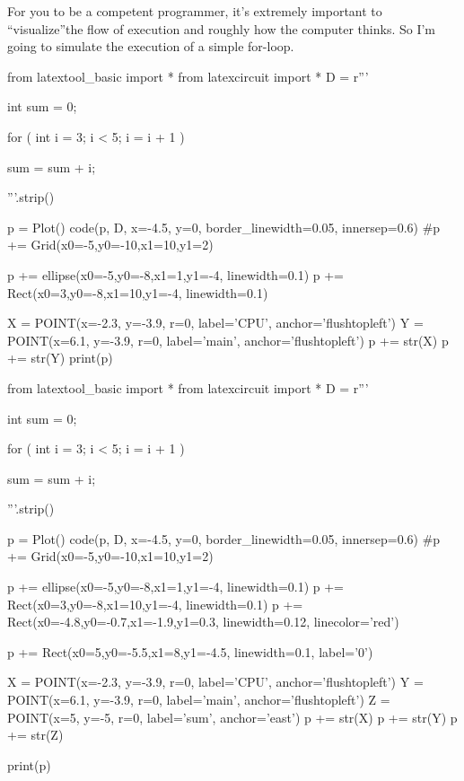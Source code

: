For you to be a competent programmer, it's extremely important to ``visualize''the flow of execution and roughly how the computer thinks. So I'm going to simulate the execution of a simple for-loop.

\begin{python}
from latextool_basic import *
from latexcircuit import *
D = r'''



int sum = 0;

    for ( int i = 3;     i < 5;     i = i + 1 )


        sum = sum + i;



'''.strip()

p = Plot()
code(p, D, x=-4.5, y=0, border_linewidth=0.05, innersep=0.6)
#p += Grid(x0=-5,y0=-10,x1=10,y1=2)

p += ellipse(x0=-5,y0=-8,x1=1,y1=-4, linewidth=0.1)
p += Rect(x0=3,y0=-8,x1=10,y1=-4, linewidth=0.1)

X = POINT(x=-2.3, y=-3.9, r=0, label='CPU', anchor='flushtopleft')
Y = POINT(x=6.1, y=-3.9, r=0, label='main', anchor='flushtopleft')
p += str(X)
p += str(Y)
print(p)
\end{python}

\begin{python}
from latextool_basic import *
from latexcircuit import *
D = r'''



int sum = 0;

    for ( int i = 3;     i < 5;     i = i + 1 )


        sum = sum + i;



'''.strip()

p = Plot()
code(p, D, x=-4.5, y=0, border_linewidth=0.05, innersep=0.6)
#p += Grid(x0=-5,y0=-10,x1=10,y1=2)

p += ellipse(x0=-5,y0=-8,x1=1,y1=-4, linewidth=0.1)
p += Rect(x0=3,y0=-8,x1=10,y1=-4, linewidth=0.1)
p += Rect(x0=-4.8,y0=-0.7,x1=-1.9,y1=0.3, linewidth=0.12, linecolor='red')

p += Rect(x0=5,y0=-5.5,x1=8,y1=-4.5, linewidth=0.1, label='0')

X = POINT(x=-2.3, y=-3.9, r=0, label='CPU', anchor='flushtopleft')
Y = POINT(x=6.1, y=-3.9, r=0, label='main', anchor='flushtopleft')
Z = POINT(x=5, y=-5, r=0, label='sum', anchor='east')
p += str(X)
p += str(Y)
p += str(Z)

print(p)
\end{python}

